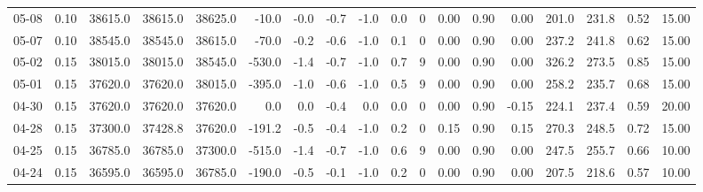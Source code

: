 \begin{threeparttable}
{\begin{tabular}{lrrrrrrrrrrrrrrrrr}
  05-08 &     0.10 & 38615.0 & 38615.0 & 38625.0 &      -10.0 &           -0.0 &                      -0.7 &                     -1.0 &                 0.0 &              0 &       0.00 &      0.90 &           0.00 &            201.0 &               231.8 &            0.52 &                  15.00 \\
  05-07 &     0.10 & 38545.0 & 38545.0 & 38615.0 &      -70.0 &           -0.2 &                      -0.6 &                     -1.0 &                 0.1 &              0 &       0.00 &      0.90 &           0.00 &            237.2 &               241.8 &            0.62 &                  15.00 \\
  05-02 &     0.15 & 38015.0 & 38015.0 & 38545.0 &     -530.0 &           -1.4 &                      -0.7 &                     -1.0 &                 0.7 &              9 &       0.00 &      0.90 &           0.00 &            326.2 &               273.5 &            0.85 &                  15.00 \\
  05-01 &     0.15 & 37620.0 & 37620.0 & 38015.0 &     -395.0 &           -1.0 &                      -0.6 &                     -1.0 &                 0.5 &              9 &       0.00 &      0.90 &           0.00 &            258.2 &               235.7 &            0.68 &                  15.00 \\
  04-30 &     0.15 & 37620.0 & 37620.0 & 37620.0 &        0.0 &            0.0 &                      -0.4 &                      0.0 &                 0.0 &              0 &       0.00 &      0.90 &          -0.15 &            224.1 &               237.4 &            0.59 &                  20.00 \\
  04-28 &     0.15 & 37300.0 & 37428.8 & 37620.0 &     -191.2 &           -0.5 &                      -0.4 &                     -1.0 &                 0.2 &              0 &       0.15 &      0.90 &           0.15 &            270.3 &               248.5 &            0.72 &                  15.00 \\
  04-25 &     0.15 & 36785.0 & 36785.0 & 37300.0 &     -515.0 &           -1.4 &                      -0.7 &                     -1.0 &                 0.6 &              9 &       0.00 &      0.90 &           0.00 &            247.5 &               255.7 &            0.66 &                  10.00 \\
  04-24 &     0.15 & 36595.0 & 36595.0 & 36785.0 &     -190.0 &           -0.5 &                      -0.1 &                     -1.0 &                 0.2 &              0 &       0.00 &      0.90 &           0.00 &            207.5 &               218.6 &            0.57 &                  10.00 \\

\end{tabular}}
\end{threeparttable}
